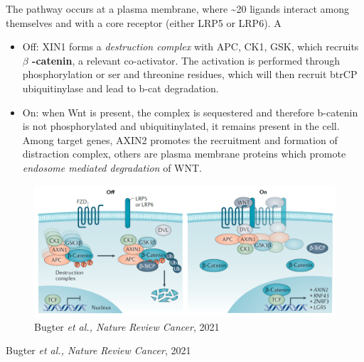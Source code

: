 The pathway occurs at a plasma membrane, where \textasciitilde20 ligands interact among themselves and with a core receptor (either LRP5 or LRP6). A

\begin{itemize}
\tightlist
\item
  Off: XIN1 forms a \emph{destruction complex} with APC, CK1, GSK, which recruits \textbf{$\beta$  -catenin}, a relevant co-activator. The activation is performed through phosphorylation or ser and threonine residues, which will then recruit btrCP ubiquitinylase and lead to b-cat degradation.
\item
  On: when Wnt is present, the complex is sequestered and therefore b-catenin is not phosphorylated and ubiquitinylated, it remains present in the cell. Among target genes, AXIN2 promotes the recruitment and formation of distraction complex, others are plasma membrane proteins which promote \emph{endosome mediated degradation} of WNT.
\end{itemize}

\begin{figure}
\centering
\includegraphics[width=\textwidth]{../_resources/Screenshot_2022-10-10_at_11-03-55.png}
\caption{Bugter \emph{et al., Nature Review Cancer}, 2021}
\end{figure}

Bugter \emph{et al., Nature Review Cancer}, 2021

